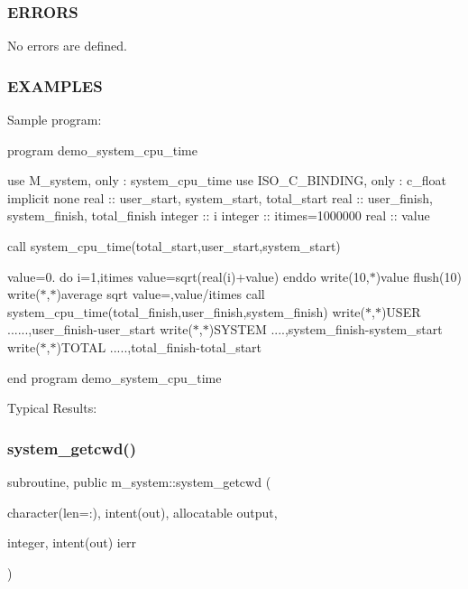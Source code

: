 \subsubsection*{E\+R\+R\+O\+RS}

No errors are defined.

\subsubsection*{E\+X\+A\+M\+P\+L\+ES}

Sample program\+:

program demo\+\_\+system\+\_\+cpu\+\_\+time

use M\+\_\+system, only \+: system\+\_\+cpu\+\_\+time use I\+S\+O\+\_\+\+C\+\_\+\+B\+I\+N\+D\+I\+NG, only \+: c\+\_\+float implicit none real \+:\+: user\+\_\+start, system\+\_\+start, total\+\_\+start real \+:\+: user\+\_\+finish, system\+\_\+finish, total\+\_\+finish integer \+:\+: i integer \+:\+: itimes=1000000 real \+:\+: value

call system\+\_\+cpu\+\_\+time(total\+\_\+start,user\+\_\+start,system\+\_\+start)

value=0. do i=1,itimes value=sqrt(real(i)+value) enddo write(10,$\ast$)value flush(10) write($\ast$,$\ast$)\textquotesingle{}average sqrt value=\textquotesingle{},value/itimes call system\+\_\+cpu\+\_\+time(total\+\_\+finish,user\+\_\+finish,system\+\_\+finish) write($\ast$,$\ast$)\textquotesingle{}U\+S\+ER ......\textquotesingle{},user\+\_\+finish-\/user\+\_\+start write($\ast$,$\ast$)\textquotesingle{}S\+Y\+S\+T\+EM ....\textquotesingle{},system\+\_\+finish-\/system\+\_\+start write($\ast$,$\ast$)\textquotesingle{}T\+O\+T\+AL .....\textquotesingle{},total\+\_\+finish-\/total\+\_\+start

end program demo\+\_\+system\+\_\+cpu\+\_\+time

Typical Results\+: \mbox{\label{namespacem__system_a5a32db818a9ffb0a4ea724e95356c560}} 
\subsubsection{\texorpdfstring{system\+\_\+getcwd()}{system\_getcwd()}}
{\footnotesize\ttfamily subroutine, public m\+\_\+system\+::system\+\_\+getcwd (\begin{DoxyParamCaption}\item[{character(len=\+:), intent(out), allocatable}]{output,  }\item[{integer, intent(out)}]{ierr }\end{DoxyParamCaption})}



